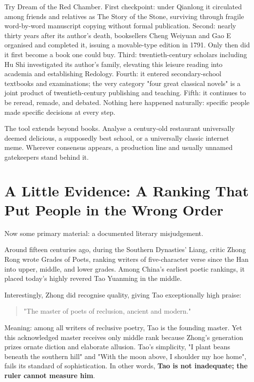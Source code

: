 Try Dream of the Red Chamber. First checkpoint: under Qianlong it circulated among friends and relatives as The Story of the Stone, surviving through fragile word-by-word manuscript copying without formal publication. Second: nearly thirty years after its author's death, booksellers Cheng Weiyuan and Gao E organised and completed it, issuing a movable-type edition in 1791. Only then did it first become a book one could buy. Third: twentieth-century scholars including Hu Shi investigated its author's family, elevating this leisure reading into academia and establishing Redology. Fourth: it entered secondary-school textbooks and examinations; the very category "four great classical novels" is a joint product of twentieth-century publishing and teaching. Fifth: it continues to be reread, remade, and debated. Nothing here happened naturally: specific people made specific decisions at every step.

The tool extends beyond books. Analyse a century-old restaurant universally deemed delicious, a supposedly best school, or a universally classic internet meme. Wherever consensus appears, a production line and usually unnamed gatekeepers stand behind it.

\section[Evidence: A Misjudged Ranking]{A Little Evidence: A Ranking That Put People in the Wrong Order}
Now some primary material: a documented literary misjudgement.

Around fifteen centuries ago, during the Southern Dynasties' Liang, critic Zhong Rong wrote Grades of Poets, ranking writers of five-character verse since the Han into upper, middle, and lower grades. Among China's earliest poetic rankings, it placed today's highly revered Tao Yuanming in the middle.

Interestingly, Zhong did recognise quality, giving Tao exceptionally high praise:

\begin{quote}
"The master of poets of reclusion, ancient and modern."
\end{quote}
Meaning: among all writers of reclusive poetry, Tao is the founding master. Yet this acknowledged master receives only middle rank because Zhong's generation prizes ornate diction and elaborate allusion. Tao's simplicity, "I plant beans beneath the southern hill" and "With the moon above, I shoulder my hoe home", fails its standard of sophistication. In other words, \textbf{Tao is not inadequate; the ruler cannot measure him}.

